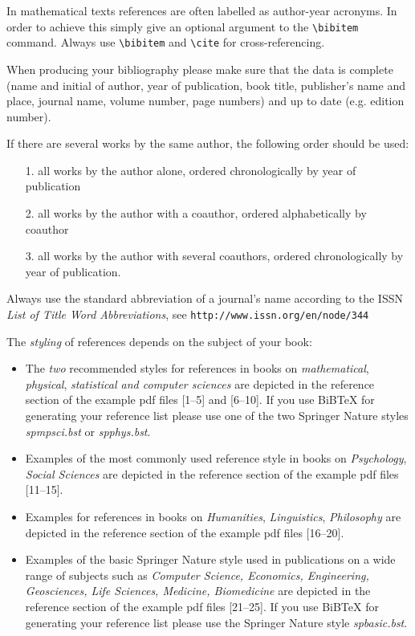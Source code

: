 \documentclass[graybox]{svmult}
\begin{document}
\begin{refguide}
\begin{sloppy}
In mathematical texts references are often labelled as author-year acronyms. In order to achieve this simply give an optional argument to the \verb|\bibitem| command. Always use \verb|\bibitem| and \verb|\cite| for cross-referencing.

When producing your bibliography please make sure that the data is complete (name and initial of author, year of publication, book title, publisher's name and place, journal name, volume number, page numbers) and up to date (e.g. edition number).


If there are several works by the same author, the following order should be used:

\begin{enumerate}
\item[1.] all works by the author alone, ordered chronologically by year of publication
\item[2.] all works by the author with a coauthor, ordered alphabetically by coauthor
\item[3.] all works by the author with several coauthors, ordered chronologically by year of publication.
\end{enumerate}

Always use the standard abbreviation of a journal's name according to the ISSN \textit{List of Title Word Abbreviations}, see \texttt{http://www.issn.org/en/node/344}

The \emph{styling} of references depends on the subject of your book:

\begin{itemize}
\item The \emph{two} recommended styles for references in books on \emph{mathematical}, \emph{physical}, \emph{statistical and computer sciences} are depicted in the reference section of the example pdf files [1--5] and [6--10]. If you use BiBTeX for generating your reference list please use one of the two Springer Nature styles \emph{spmpsci.bst} or \emph{spphys.bst}.
\item Examples of the most commonly used reference style in books on \emph{Psychology}, \emph{Social Sciences} are depicted in the reference section of the example pdf files [11--15].
\item Examples for references in books on \emph{Humanities}, \emph{Linguistics}, \emph{Philosophy} are depicted in the reference section of the example pdf files [16--20].
\item Examples of the basic Springer Nature style used in publications on a wide range of subjects such as \emph{Computer Science, Economics, Engineering, Geosciences, Life Sciences, Medicine, Biomedicine} are depicted in the reference section of the example pdf files [21--25]. If you use BiBTeX for generating your reference list please use the Springer Nature style \emph{spbasic.bst}.
\end{itemize}


\end{sloppy}
\end{refguide}
\end{document}
